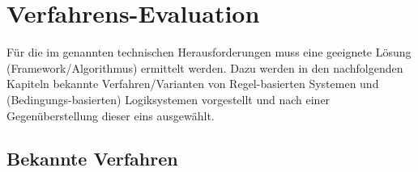 \section{Verfahrens-Evaluation}\label{sec:verfahrens-evaluation}


Für die im  genannten technischen Herausforderungen muss eine geeignete Lösung (Framework/Algorithmus) ermittelt werden.
Dazu werden in den nachfolgenden Kapiteln bekannte Verfahren/Varianten von Regel-basierten Systemen und (Bedingungs-basierten) Logiksystemen vorgestellt und nach einer Gegenüberstellung dieser eins ausgewählt.

\subsection{Bekannte Verfahren}\label{subsec:bekannte-verfahren}

